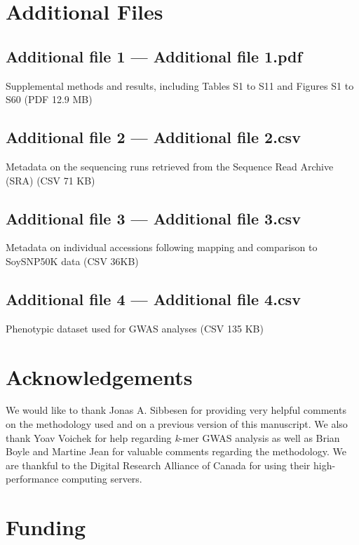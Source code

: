 \documentclass[doublespacing]{bmcart}
\begin{document}
\begin{backmatter}

\section*{Additional Files}

\subsection*{Additional file 1 --- Additional file 1.pdf}
Supplemental methods and results,
including Tables S1 to S11
and Figures S1 to S60 (PDF 12.9 MB)

\subsection*{Additional file 2 --- Additional file 2.csv}
Metadata on the sequencing runs retrieved
from the Sequence Read Archive (SRA) (CSV 71 KB)

\subsection*{Additional file 3 --- Additional file 3.csv}
Metadata on individual accessions following mapping
and comparison to SoySNP50K data (CSV 36KB)

\subsection*{Additional file 4 --- Additional file 4.csv}
Phenotypic dataset used for GWAS analyses (CSV 135 KB)

\section*{Acknowledgements}%

We would like to thank Jonas A. Sibbesen for providing very helpful comments
on the methodology used and on a previous version of this manuscript.
We also thank Yoav Voichek for help regarding \textit{k}-mer GWAS
analysis as well as Brian Boyle and Martine Jean for valuable comments
regarding the methodology. We are thankful to the Digital Research Alliance of
Canada for using their high-performance computing servers.

\section*{Funding}%


\end{backmatter}
\end{document}
